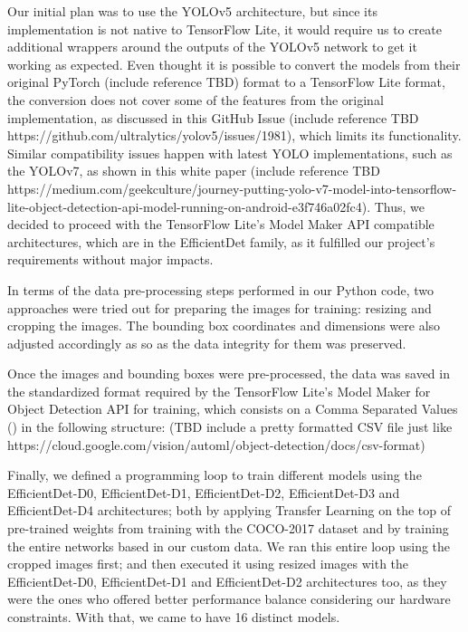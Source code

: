 \documentclass[openright]{normas-utf-tex} %
\begin{document}
Our initial plan was to use the YOLOv5 architecture, but since its implementation is not native
to TensorFlow Lite, it would require us to create additional wrappers around the outputs of the YOLOv5
network to get it working as expected. Even thought it is possible to convert the models from their
original PyTorch (include reference TBD) format to a TensorFlow Lite format, the conversion does not
cover some of the features from the original implementation, as discussed in this GitHub Issue (include reference TBD https://github.com/ultralytics/yolov5/issues/1981),
which limits its functionality.
Similar compatibility issues happen with latest YOLO implementations, such as the YOLOv7, 
as shown in this white paper (include reference TBD https://medium.com/geekculture/journey-putting-yolo-v7-model-into-tensorflow-lite-object-detection-api-model-running-on-android-e3f746a02fc4). 
Thus, we decided to proceed with the TensorFlow Lite's Model Maker API compatible architectures, 
which are in the EfficientDet family, as it fulfilled our project's requirements without major impacts.

In terms of the data pre-processing steps performed in our Python code, two approaches were
tried out for preparing the images for training: resizing and cropping the images. 
The bounding box coordinates and dimensions were also adjusted accordingly as so as the data 
integrity for them was preserved. 

Once the images and bounding boxes were pre-processed, the data was saved in the standardized
format required by the TensorFlow Lite's Model Maker for Object Detection API for training,
which consists on a Comma Separated Values () in the following
structure:
(TBD include a pretty formatted CSV file just like https://cloud.google.com/vision/automl/object-detection/docs/csv-format)

Finally, we defined a programming loop to train different models using the EfficientDet-D0,
EfficientDet-D1, EfficientDet-D2, EfficientDet-D3 and EfficientDet-D4 architectures; both by
applying Transfer Learning on the top of pre-trained weights from training with the COCO-2017 dataset 
and by training the entire networks based in our custom data. We ran this entire loop using 
the cropped images first; and then executed it using resized images with the EfficientDet-D0,
EfficientDet-D1 and EfficientDet-D2 architectures too, as they were the ones who offered better
performance balance considering our hardware constraints. With that, we came to have  16 distinct models.  
\end{document}
